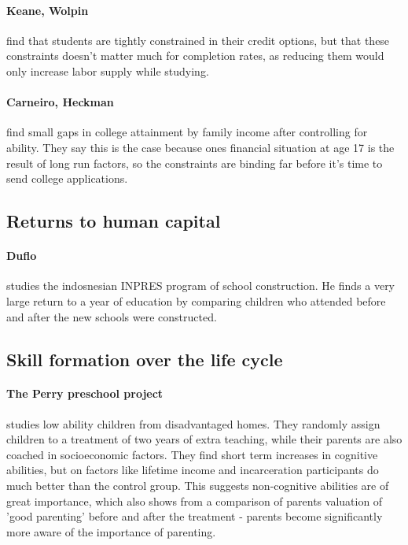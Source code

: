 \documentclass[12pt, a4paper]{article}
\begin{document}
\begin{multicols}{2}
\paragraph{Keane, Wolpin} find that students are tightly constrained in their credit options, but that these constraints doesn't matter much for completion rates, as reducing them would only increase labor supply while studying.

\paragraph{Carneiro, Heckman} find small gaps in college attainment by family income after controlling for ability. They say this is the case because ones financial situation at age 17 is the result of long run factors, so the constraints are binding far before it's time to send college applications. 

\subsection{Returns to human capital}
\paragraph{Duflo } studies the indosnesian INPRES program of school construction. He finds a very large return to a year of education by comparing children who attended before and after the new schools were constructed. 



\subsection{Skill formation over the life cycle}
\paragraph{The Perry preschool project} studies low ability children from disadvantaged homes. They randomly assign children to a treatment of two years of extra teaching, while their parents are also coached in socioeconomic factors. They find short term increases in cognitive abilities, but on factors like lifetime income and incarceration participants do much better than the control group. This suggests non-cognitive abilities are of great importance, which also shows from a comparison of parents valuation of 'good parenting' before and after the treatment - parents become significantly more aware of the importance of parenting.


\end{multicols}
\end{document}
